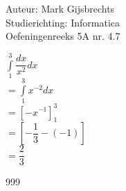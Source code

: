 \documentclass[a4paper]{article}
\newcommand{\dint}{\displaystyle\int}
\begin{document}
\noindent \large Auteur: Mark Gijsbrechts \\
\noindent \large Studierichting: Informatica\\
\noindent \large Oefeningenreeks 5A nr. 4.7\\

\medskip

\normalsize





$ \dint\limits_{1}^{3} \dfrac{dx}{x^2} dx $ \\

$= \dint\limits_{1}^{3} x^{-2} dx $ \\

$= \left[ -x^{-1} \right]_{1}^{3} $ \\

$= \left[ -\dfrac{1}{3} - (-1) \right] $ \\

$= \dfrac{2}{3} $ \\




\begin{thebibliography}{999}
\end{thebibliography}
\end{document}

